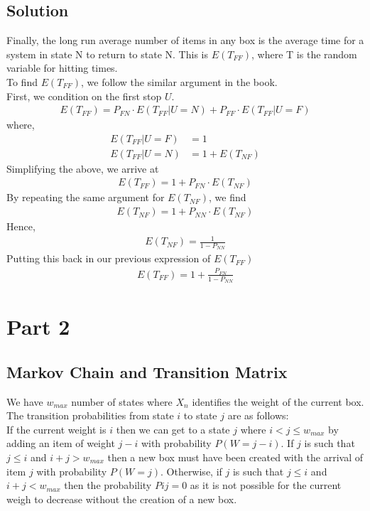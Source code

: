 \documentclass[10pt,a4paper]{article}
\begin{document}
\subsection*{Solution}
Finally, the long run average number of items in any box is the average time for a system in state N to return to state N. This is $ E(T_{FF}) $, where T is the random variable for hitting times. \\
To find $ E(T_{FF}) $, we follow the similar argument in the book. \\
First, we condition on the first stop $ U $. 
\begin{align*}
E(T_{FF}) = P_{FN}\cdot E(T_{FF}|U=N)+P_{FF}\cdot E(T_{FF}|U=F)
\end{align*}
where,\\
\begin{align*}
E(T_{FF}|U=F) &= 1 \\
E(T_{FF}|U=N) &= 1+E(T_{NF})
\end{align*}
Simplifying the above, we arrive at\\
\begin{align*}
E(T_{FF}) = 1+ P_{FN}\cdot E(T_{NF})
\end{align*}
By repeating the same argument for $ E(T_{NF}) $, we find \\
\begin{align*}
E(T_{NF}) = 1+ P_{NN}\cdot E(T_{NF})
\end{align*}
Hence, 
\begin{align*}
E(T_{NF}) = \frac{1}{1 - P_{NN}}
\end{align*}
Putting this back in our previous expression of $ E(T_{FF}) $
\begin{align*}
E(T_{FF}) = 1+ \frac{P_{FN}}{1 - P_{NN}}
\end{align*}


\section{Part 2}
\subsection{Markov Chain and Transition Matrix}
We have $w_{max}$ number of states where $X_n$ identifies the weight of the current box.\\
The transition probabilities from state $i$ to state $j$ are as follows:\\
If the current weight is $i$ then we can get to a state $j$ where $i < j \leq w_{max}$ by adding an item of weight $j-i$ with probability $P(W=j-i)$. If $j$ is such that $j \leq i$ and $i+j>w_{max}$ then a new box must have been created with the arrival of item $j$ with probability $P(W=j)$. Otherwise, if $j$ is such that $j \leq i$ and $i+j<w_{max}$ then the probability $Pij=0$ as it is not possible for the current weigh to decrease without the creation of a new box.\\
\end{document}
